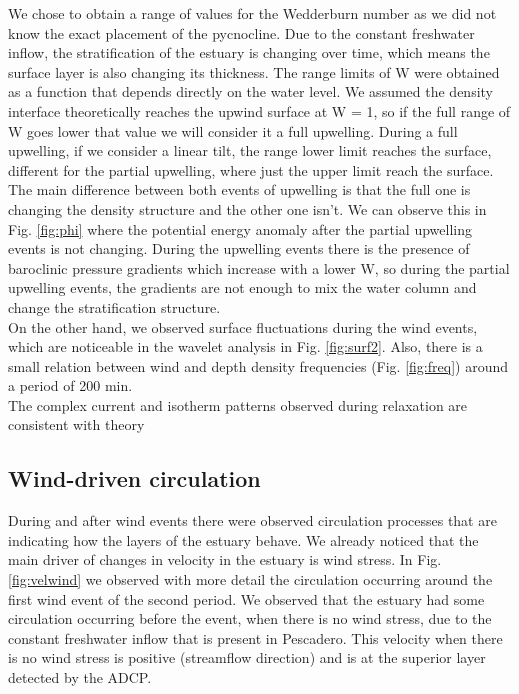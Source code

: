 \documentclass[tesis.tex]{subfiles}
\begin{document}
We chose to obtain a range of values for the Wedderburn number as we did not know the exact placement of the pycnocline. Due to the constant freshwater inflow, the stratification of the estuary is changing over time, which means the surface layer is also changing its thickness. The range limits of W were obtained as a function that depends directly on the water level. We assumed the density interface theoretically reaches the upwind surface at W = 1, so if the full range of W goes lower that value we will consider it a full upwelling. During a full upwelling, if we consider a linear tilt, the range lower limit reaches the surface, different for the partial upwelling, where just the upper limit reach the surface. The main difference between both events of upwelling is that the full one is changing the density structure and the other one isn't. We can observe this in Fig. \ref{fig:phi} where the potential energy anomaly after the partial upwelling events is not changing. During the upwelling events there is the presence of baroclinic pressure gradients which increase with a lower W, so during the partial upwelling events, the gradients are not enough to mix the water column and change the stratification structure.\\

On the other hand, we observed surface fluctuations during the wind events, which are noticeable in the wavelet analysis in Fig. \ref{fig:surf2}. Also, there is a small relation between wind and depth density frequencies (Fig. \ref{fig:freq}) around a period of 200 min.\\

The complex current and isotherm patterns observed during relaxation are consistent with theory

\subsection{Wind-driven circulation}

During and after wind events there were observed circulation processes that are indicating how the layers of the estuary behave. We already noticed that the main driver of changes in velocity in the estuary is wind stress. In Fig. \ref{fig:velwind} we observed with more detail the circulation occurring around the first wind event of the second period. We observed that the estuary had some circulation occurring before the event, when there is no wind stress, due to the constant freshwater inflow that is present in Pescadero. This velocity when there is no wind stress is positive (streamflow direction) and is at the superior layer detected by the ADCP.\\
\end{document}
